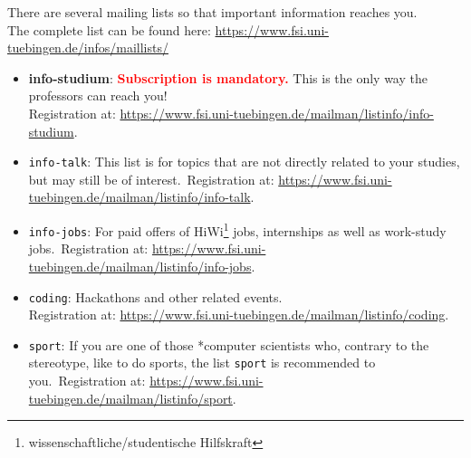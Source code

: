 There are several mailing lists so that important information reaches you.\\
The complete list can be found here: \url{https://www.fsi.uni-tuebingen.de/infos/maillists/}
\begin{itemize}
	\item \textbf{info-studium}: \textcolor{red}{\textbf{Subscription is mandatory.}} This is the only way the professors can reach you! \\
	Registration at: \url{https://www.fsi.uni-tuebingen.de/mailman/listinfo/info-studium}.
	\item \texttt{info-talk}: This list is for topics that are not directly related to your studies, but may still be of interest.\
	Registration at: \url{https://www.fsi.uni-tuebingen.de/mailman/listinfo/info-talk}.
	\item \texttt{info-jobs}: For paid offers of HiWi\footnote{wissenschaftliche/studentische Hilfskraft} jobs, internships as well as work-study jobs.\
	Registration at: \url{https://www.fsi.uni-tuebingen.de/mailman/listinfo/info-jobs}.
	\item \texttt{coding}: Hackathons and other related events.\\
	Registration at: \url{https://www.fsi.uni-tuebingen.de/mailman/listinfo/coding}.
	\item \texttt{sport}: If you are one of those *computer scientists who, contrary to the stereotype, like to do sports, the list \texttt{sport} is recommended to you.\
	Registration at: \url{https://www.fsi.uni-tuebingen.de/mailman/listinfo/sport}. 
\end{itemize}
